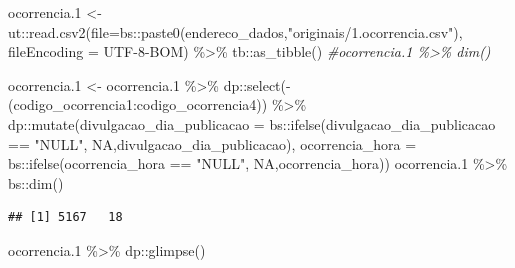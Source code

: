 \documentclass[
]{article}
\newenvironment{Shaded}{\begin{snugshade}}{\end{snugshade}}
\newcommand{\AttributeTok}[1]{\textcolor[rgb]{0.77,0.63,0.00}{#1}}
\newcommand{\CommentTok}[1]{\textcolor[rgb]{0.56,0.35,0.01}{\textit{#1}}}
\newcommand{\ConstantTok}[1]{\textcolor[rgb]{0.00,0.00,0.00}{#1}}
\newcommand{\FloatTok}[1]{\textcolor[rgb]{0.00,0.00,0.81}{#1}}
\newcommand{\FunctionTok}[1]{\textcolor[rgb]{0.00,0.00,0.00}{#1}}
\newcommand{\NormalTok}[1]{#1}
\newcommand{\OtherTok}[1]{\textcolor[rgb]{0.56,0.35,0.01}{#1}}
\newcommand{\SpecialCharTok}[1]{\textcolor[rgb]{0.00,0.00,0.00}{#1}}
\newcommand{\StringTok}[1]{\textcolor[rgb]{0.31,0.60,0.02}{#1}}
\begin{document}
\begin{Shaded}
\begin{Highlighting}[]
\NormalTok{ocorrencia}\FloatTok{.1} \OtherTok{\textless{}{-}}\NormalTok{ ut}\SpecialCharTok{::}\FunctionTok{read.csv2}\NormalTok{(}\AttributeTok{file=}\NormalTok{bs}\SpecialCharTok{::}\FunctionTok{paste0}\NormalTok{(endereco\_dados,}\StringTok{"originais/1.ocorrencia.csv"}\NormalTok{),}
                            \AttributeTok{fileEncoding =} \StringTok{\textquotesingle{}UTF{-}8{-}BOM\textquotesingle{}}\NormalTok{) }\SpecialCharTok{\%\textgreater{}\%} 
\NormalTok{                tb}\SpecialCharTok{::}\FunctionTok{as\_tibble}\NormalTok{()}
\CommentTok{\#ocorrencia.1 \%\textgreater{}\% dim()}


\NormalTok{ocorrencia}\FloatTok{.1} \OtherTok{\textless{}{-}}\NormalTok{ ocorrencia}\FloatTok{.1} \SpecialCharTok{\%\textgreater{}\%}
\NormalTok{    dp}\SpecialCharTok{::}\FunctionTok{select}\NormalTok{(}\SpecialCharTok{{-}}\NormalTok{(}\StringTok{\textquotesingle{}codigo\_ocorrencia1\textquotesingle{}}\SpecialCharTok{:}\StringTok{\textquotesingle{}codigo\_ocorrencia4\textquotesingle{}}\NormalTok{)) }\SpecialCharTok{\%\textgreater{}\%} 
\NormalTok{    dp}\SpecialCharTok{::}\FunctionTok{mutate}\NormalTok{(}\AttributeTok{divulgacao\_dia\_publicacao =}\NormalTok{ bs}\SpecialCharTok{::}\FunctionTok{ifelse}\NormalTok{(divulgacao\_dia\_publicacao }\SpecialCharTok{==} \StringTok{"NULL"}\NormalTok{,}
                                                     \ConstantTok{NA}\NormalTok{,divulgacao\_dia\_publicacao),}
                  \AttributeTok{ocorrencia\_hora =}\NormalTok{ bs}\SpecialCharTok{::}\FunctionTok{ifelse}\NormalTok{(ocorrencia\_hora }\SpecialCharTok{==} \StringTok{"NULL"}\NormalTok{,}
                                           \ConstantTok{NA}\NormalTok{,ocorrencia\_hora))}
\NormalTok{ocorrencia}\FloatTok{.1} \SpecialCharTok{\%\textgreater{}\%}\NormalTok{ bs}\SpecialCharTok{::}\FunctionTok{dim}\NormalTok{()}
\end{Highlighting}
\end{Shaded}

\begin{verbatim}
## [1] 5167   18
\end{verbatim}

\begin{Shaded}
\begin{Highlighting}[]
\NormalTok{ocorrencia}\FloatTok{.1} \SpecialCharTok{\%\textgreater{}\%}\NormalTok{ dp}\SpecialCharTok{::}\FunctionTok{glimpse}\NormalTok{()}
\end{Highlighting}
\end{Shaded}
\end{document}
